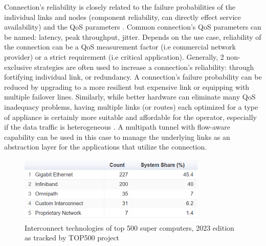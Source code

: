 Connection's reliability is closely related to the failure probabilities of the individual links and nodes (component reliability, can directly effect service availability) \cite{shooman_algorithms_1995} and the \ac{QoS} parameters \cite{gozdecki_quality_2003}.
Common connection's \ac{QoS}  parameters can be named: latency, peak throughput, jitter.
Depends on the use case, reliability of the connection can be a \ac{QoS} measurement factor (i.e commercial network provider) or a strict requirement (i.e critical application).
Generally, 2 non-exclusive strategies are often used to increase a connection's reliability: through fortifying individual link, or redundancy.
A connection's failure probability can be reduced by upgrading to a more resilient but expensive link or equipping with multiple failover lines. 
Similarly, while better hardware can eliminate many \ac{QoS} inadequacy problems, having multiple links (or routes) each optimized for a type of appliance is certainly more suitable and affordable for the operator, especially if the data traffic is heterogeneous \cite{chen_overview_1998}.
A multipath tunnel with flow-aware capability can be used in this case to manage the underlying links as an abstraction layer for the applications that utilize the connection.  



\begin{figure}[H]
	\centering
	\includegraphics[width=0.8\textwidth]{resources/images/Interconnect_Technologies_500_supercomp.PNG}
	\caption{Interconnect technologies of top 500 super computers, 2023 edition as tracked by TOP500 project \cite{Interconnect_Technologies_500_supercomp}}
    \label{fig:introduction:Interconnect_Technologies_500_supercomp}
\end{figure}

